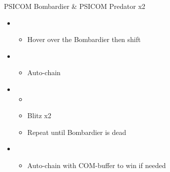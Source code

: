 \begin{battle}{PSICOM Bombardier \& PSICOM Predator x2}
\begin{itemize}
    \item \first
    \begin{itemize}
        \item Hover over the Bombardier then shift
    \end{itemize}
    \item \second
    \begin{itemize}
        \item Auto-chain
    \end{itemize}
    \item \first
    \begin{itemize}
        \item \stagger
        \item Blitz x2
        \item Repeat until Bombardier is dead
    \end{itemize}
    \item \second
    \begin{itemize}
        \item Auto-chain with COM-buffer to win if needed
    \end{itemize}
\end{itemize}
 
\end{battle}


